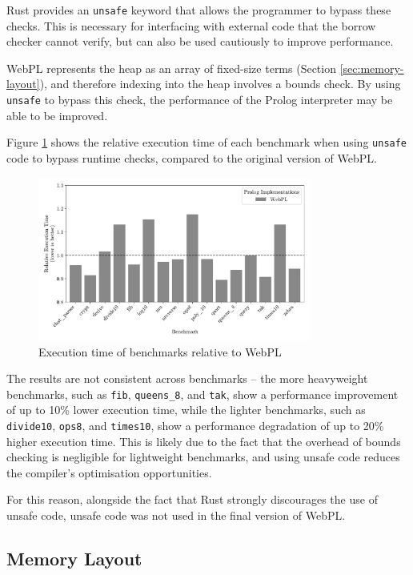 Rust provides an \texttt{unsafe} keyword that allows the programmer to bypass these checks. This is necessary for interfacing with external code that the borrow checker cannot verify, but can also be used cautiously to improve performance.

WebPL represents the heap as an array of fixed-size terms (Section \ref{sec:memory-layout}), and therefore indexing into the heap involves a bounds check. By using \texttt{unsafe} to bypass this check, the performance of the Prolog interpreter may be able to be improved.

Figure \ref{fig:unsafe} shows the relative execution time of each benchmark when using \texttt{unsafe} code to bypass runtime checks, compared to the original version of WebPL.

\begin{figure}[H]
\centering
\includegraphics[width=0.8\textwidth]{relative_performance_unsafe.pdf}
\caption{Execution time of benchmarks relative to WebPL}
\label{fig:unsafe}
\end{figure}

The results are not consistent across benchmarks -- the more heavyweight benchmarks, such as \texttt{fib}, \texttt{queens\_8}, and \texttt{tak}, show a performance improvement of up to 10\% lower execution time, while the lighter benchmarks, such as \texttt{divide10}, \texttt{ops8}, and \texttt{times10}, show a performance degradation of up to 20\% higher execution time. This is likely due to the fact that the overhead of bounds checking is negligible for lightweight benchmarks, and using unsafe code reduces the compiler's optimisation opportunities.

For this reason, alongside the fact that Rust strongly discourages the use of unsafe code, unsafe code was not used in the final version of WebPL.

\subsection{Memory Layout}

